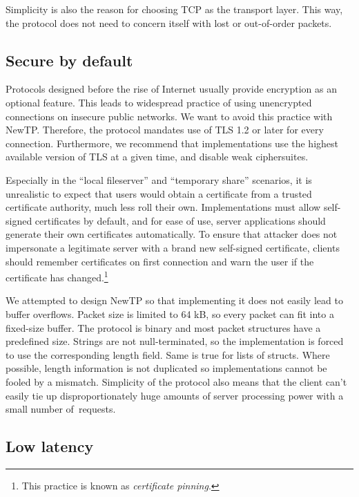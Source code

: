 Simplicity is also the reason for choosing TCP as the transport layer. This way, the protocol does not need to
concern itself with lost or out-of-order packets.

%

\subsection{Secure by default}

Protocols designed before the rise of Internet usually provide encryption as an optional feature. This leads
to widespread practice of using unencrypted connections on insecure public networks. We want to avoid this
practice with NewTP. Therefore, the protocol mandates use of TLS 1.2 or later for every connection.
Furthermore, we recommend that implementations use the highest available version of TLS at a given time, and
disable weak ciphersuites.

Especially in the ``local fileserver'' and ``temporary share'' scenarios, it is unrealistic to expect that
users would obtain a certificate from a trusted certificate authority, much less roll their own.
Implementations must allow self-signed certificates by default, and for ease of use, server applications
should generate their own certificates automatically. To ensure that attacker does not impersonate
a legitimate server with a brand new self-signed certificate, clients should remember certificates on first
connection and warn the user if the certificate has changed.\footnote{This practice is known as {\it
certificate pinning}.}

We attempted to design NewTP so that implementing it does not easily lead to buffer overflows.  Packet size is
limited to 64 kB, so every packet can fit into a fixed-size buffer. The protocol is binary and most packet
structures have a predefined size. Strings are not null-terminated, so the implementation is forced to use the
corresponding length field. Same is true for lists of structs. Where possible, length information is not
duplicated so implementations cannot be fooled by a mismatch. Simplicity of the protocol also means that the
client can't easily tie up disproportionately huge amounts of server processing power with a small number
of~requests.

%

\subsection{Low latency}

